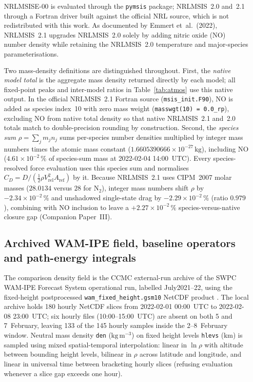 \documentclass[12pt]{article}
\newcommand{\unit}[1]{\,\mathrm{#1}}
\begin{document}
NRLMSISE-00 \citep{picone2002} is evaluated through the \texttt{pymsis} package;
NRLMSIS~2.0 \citep{emmert2021} and~2.1 through a Fortran driver built against the
official NRL source, which is not redistributed with this work. As documented by Emmert et~al.\ (2022)\nocite{emmert2022}, NRLMSIS~2.1 upgrades NRLMSIS~2.0 solely by adding nitric oxide (NO) number density while retaining the NRLMSIS~2.0 temperature and major-species parameterisations.

Two mass-density definitions are distinguished throughout. First, the \emph{native model total} is the aggregate mass density returned directly by each model; all fixed-point peaks and inter-model ratios in Table~\ref{tab:atmos} use this native output. In the official NRLMSIS~2.1 Fortran source (\texttt{msis\_init.F90}), NO is added as species index~10 with zero mass weight (\texttt{masswgt(10) = 0.0\_rp}), excluding NO from native total density so that native NRLMSIS~2.1 and~2.0 totals match to double-precision rounding by construction. Second, the \emph{species sum} $\rho = \sum_j m_j n_j$ sums per-species number densities multiplied by integer mass numbers times the atomic mass constant ($1.6605390666\times10^{-27}\unit{kg}$), including NO ($4.61\times10^{-2}\,\%$ of species-sum mass at 2022-02-04 14:00~UTC). Every species-resolved force evaluation uses this species sum and normalises $C_D = D/(\tfrac12 \rho V_{\mathrm{rel}}^2 A_{\mathrm{ref}})$ by it. Because NRLMSIS~2.1 uses CIPM~2007 molar masses ($28.0134$ versus $28$ for $\mathrm{N_2}$), integer mass numbers shift $\rho$ by $-2.34\times10^{-2}\,\%$ and unshadowed single-state drag by $-2.29\times10^{-2}\,\%$ (ratio $0.979$), combining with NO inclusion to leave a $+2.27\times10^{-2}\,\%$ species-versus-native closure gap (Companion Paper~III).

\subsection{Archived WAM-IPE field, baseline operators and path-energy integrals}
\label{sec:wam}

The comparison density field is the CCMC external-run archive of the SWPC WAM-IPE Forecast System operational run, labelled July2021--22, using the fixed-height postprocessed \nolinkurl{wam_fixed_height.gsm10} NetCDF product \citep{ccmcwamipe}. The local archive holds 180 hourly NetCDF slices from 2022-02-01 00:00~UTC to 2022-02-08 23:00~UTC; six hourly files (10:00--15:00~UTC) are absent on both 5 and 7~February, leaving 133 of the 145 hourly samples inside the 2--8~February window. Neutral mass density \texttt{den} ($\mathrm{kg\,m^{-3}}$) on fixed height levels \texttt{hlevs} ($\mathrm{km}$) is sampled using mixed spatial-temporal interpolation: linear in $\ln\rho$ with altitude between bounding height levels, bilinear in $\rho$ across latitude and longitude, and linear in universal time between bracketing hourly slices (refusing evaluation whenever a slice gap exceeds one hour).
\end{document}
